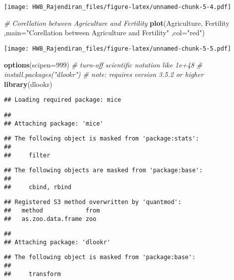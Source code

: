 \documentclass[]{article}
\newenvironment{Shaded}{\begin{snugshade}}{\end{snugshade}}
\newcommand{\CommentTok}[1]{\textcolor[rgb]{0.56,0.35,0.01}{\textit{#1}}}
\newcommand{\DataTypeTok}[1]{\textcolor[rgb]{0.13,0.29,0.53}{#1}}
\newcommand{\DecValTok}[1]{\textcolor[rgb]{0.00,0.00,0.81}{#1}}
\newcommand{\KeywordTok}[1]{\textcolor[rgb]{0.13,0.29,0.53}{\textbf{#1}}}
\newcommand{\NormalTok}[1]{#1}
\newcommand{\StringTok}[1]{\textcolor[rgb]{0.31,0.60,0.02}{#1}}
\begin{document}
\texttt{[image: HW8\_Rajendiran\_files/figure-latex/unnamed-chunk-5-4.pdf]}

\begin{Shaded}
\begin{Highlighting}[]
\CommentTok{# Corellation between Agriculture and Fertility}
\KeywordTok{plot}\NormalTok{(Agriculture, Fertility}
\NormalTok{     ,}\DataTypeTok{main=}\StringTok{"Corellation between Agriculture and Fertility"}
\NormalTok{     ,}\DataTypeTok{col=}\StringTok{"red"}\NormalTok{)}
\end{Highlighting}
\end{Shaded}

\texttt{[image: HW8\_Rajendiran\_files/figure-latex/unnamed-chunk-5-5.pdf]}

\begin{Shaded}
\begin{Highlighting}[]
\KeywordTok{options}\NormalTok{(}\DataTypeTok{scipen=}\DecValTok{999}\NormalTok{)  }\CommentTok{# turn-off scientific notation like 1e+48}
\CommentTok{# install.packages("dlookr")  # note: requires version 3.5.2 or higher}
\KeywordTok{library}\NormalTok{(dlookr)}
\end{Highlighting}
\end{Shaded}

\begin{verbatim}
## Loading required package: mice
\end{verbatim}

\begin{verbatim}
## 
## Attaching package: 'mice'
\end{verbatim}

\begin{verbatim}
## The following object is masked from 'package:stats':
## 
##     filter
\end{verbatim}

\begin{verbatim}
## The following objects are masked from 'package:base':
## 
##     cbind, rbind
\end{verbatim}

\begin{verbatim}
## Registered S3 method overwritten by 'quantmod':
##   method            from
##   as.zoo.data.frame zoo
\end{verbatim}

\begin{verbatim}
## 
## Attaching package: 'dlookr'
\end{verbatim}

\begin{verbatim}
## The following object is masked from 'package:base':
## 
##     transform
\end{verbatim}
\end{document}
